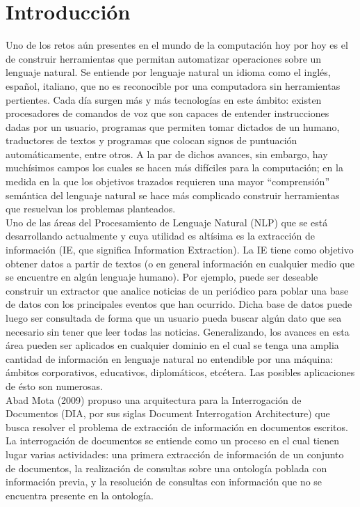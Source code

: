 \chapter*{Introducción} \label{chap:intro}

Uno de los retos aún presentes en el mundo de la computación hoy por hoy es el de construir herramientas que permitan automatizar operaciones sobre un lenguaje natural. Se entiende por lenguaje natural un idioma como el inglés, español, italiano, que no es reconocible por una computadora sin herramientas pertientes. Cada día surgen más y más tecnologías en este ámbito: existen procesadores de comandos de voz que son capaces de entender instrucciones dadas por un usuario, programas que permiten tomar dictados de un humano, traductores de textos y programas que colocan signos de puntuación automáticamente, entre otros. A la par de dichos avances, sin embargo, hay muchísimos campos los cuales se hacen más difíciles para la computación; en la medida en la que los objetivos trazados requieren una mayor ``comprensión'' semántica del lenguaje natural se hace más complicado construir herramientas que resuelvan los problemas planteados. \\ 

Uno de las áreas del Procesamiento de Lenguaje Natural (NLP) que se está desarrollando actualmente y cuya utilidad es altísima es la extracción de información (IE, que significa Information Extraction). La IE tiene como objetivo obtener datos a partir de textos (o en general información en cualquier medio que se encuentre en algún lenguaje humano). Por ejemplo, puede ser deseable construir un extractor que analice noticias de un periódico para poblar una base de datos con los principales eventos que han ocurrido. Dicha base de datos puede luego ser consultada de forma que un usuario pueda buscar algún dato que sea necesario sin tener que leer todas las noticias. Generalizando, los avances en esta  área pueden ser aplicados en cualquier dominio en el cual se tenga una amplia cantidad de información en lenguaje natural no entendible por una máquina: ámbitos corporativos, educativos, diplomáticos, etcétera. Las posibles aplicaciones de ésto son numerosas.\\

Abad Mota (2009) \cite{documentInterrogationArchitecture} propuso una arquitectura para la Interrogación de Documentos (DIA, por sus siglas Document Interrogation Architecture) que busca resolver el problema de extracción de información en documentos escritos. La interrogación de documentos se entiende como un proceso en el cual tienen lugar varias actividades: una primera extracción de información de un conjunto de documentos, la realización de consultas sobre una ontología poblada con información previa, y la resolución de consultas con información que no se encuentra presente en la ontología. \\

